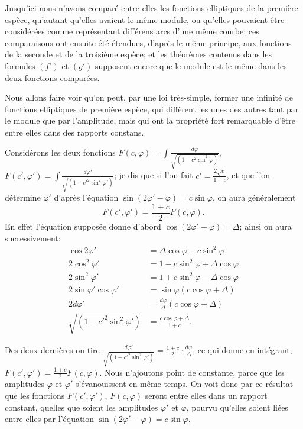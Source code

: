 \documentclass{article}
\begin{document}
Jusqu'ici nous n'avons comparé entre elles les fonctions elliptiques de la première espèce, qu'autant qu'elles avaient le même module, ou qu'elles pouvaient être considérées comme représentant différens arcs d'une même courbe; ces comparaisons ont ensuite été étendues, d'après le même principe, aux fonctions de la seconde et de la troisième espèce; et les théorèmes contenus dans les formules $(f')$ et $(g')$ supposent encore que le module est le même dans les deux fonctions comparées.

Nous allons faire voir qu'on peut, par une loi très-simple, former une infinité de fonctions elliptiques de première espèce, qui diffèrent les unes des autres tant par le module que par l'amplitude, mais qui ont la propriété fort remarquable d'être entre elles dans des rapports constans.

Considérons les deux fonctions $F(c,\varphi)=\displaystyle\int\frac{d\varphi}{\sqrt{(1-c^{2}\sin^{2}\varphi)}}$, $F(c',\varphi')=\displaystyle\int\frac{d\varphi'}{\sqrt{(1-c'^{2}\sin^{2}\varphi')}}$; je dis que si l'on fait $c'=\frac{2\sqrt{c}}{1+c}$, et que l'on détermine $\varphi'$ d'après l'équation $\sin(2\varphi'-\varphi)=c\sin\varphi$, on aura généralement
\[ F(c',\varphi')=\frac{1+c}{2}F(c,\varphi). \]
En effet l'équation supposée donne d'abord $\cos(2\varphi'-\varphi)=\Delta$; ainsi on aura successivement:
\[ \begin{aligned} \cos2\varphi'&=\Delta\cos\varphi-c\sin^{2}\varphi\\ 2\cos^{2}\varphi'&=1-c\sin^{2}\varphi+\Delta\cos\varphi\\ 2\sin^{2}\varphi'&=1+c\sin^{2}\varphi-\Delta\cos\varphi\\ 2\sin\varphi'\cos\varphi'&=\sin\varphi(c\cos\varphi+\Delta)\\ 2d\varphi'&=\frac{d\varphi}{\Delta}(c\cos\varphi+\Delta)\\ \sqrt{(1-c'^{2}\sin^{2}\varphi')}&=\frac{c\cos\varphi+\Delta}{1+c}. \end{aligned} \]

Des deux dernières on tire $\frac{d\varphi'}{\sqrt{(1-c'^{2}\sin^{2}\varphi')}}=\frac{1+c}{2}\cdot\frac{d\varphi}{\Delta}$, ce qui donne en intégrant, $F(c',\varphi')=\frac{1+c}{2}F(c,\varphi)$. Nous n'ajoutons point de constante, parce que les amplitudes $\varphi$ et $\varphi'$ s'évanouissent en même temps. On voit donc par ce résultat que les fonctions $F(c',\varphi')$, $F(c,\varphi)$ seront entre elles dans un rapport constant, quelles que soient les amplitudes $\varphi'$ et $\varphi$, pourvu qu'elles soient liées entre elles par l'équation $\sin(2\varphi'-\varphi)=c\sin\varphi$.
\end{document}
